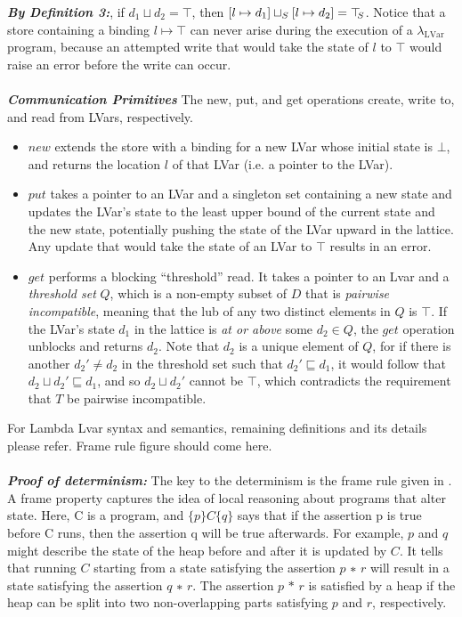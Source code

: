 \documentclass[twocolumn]{article}
\newcommand{\lambdaLVar}{\ensuremath{\lambda_{\textrm{LVar}}}}
\newcommand{\userleq}{\ensuremath{\sqsubseteq}}
\newcommand{\topS}{\ensuremath{\top\hspace{-0.85mm}_{S}}}
\newcommand{\userlub}[2]{\ensuremath{#1 \sqcup #2}}
\newcommand{\lubstore}[2]{\ensuremath{#1 \sqcup_{S} #2}}
\newcommand{\storebindingRaw}[2]{\ensuremath{#1 \mapsto #2}}
\newcommand{\store}[1]{\left[ #1 \right]}
\begin{document}
\textbf{\textit{By Definition 3:}}, if $\userlub{d_1}{d_2} = \top$, then $\lubstore{\store{\storebindingRaw{l}{d_1}}}{\store{\storebindingRaw{l}{d_2}}} = \topS$. Notice that a store containing a binding $\storebindingRaw{l}{\top}$ can never arise during the execution of a $\lambdaLVar$ program, because an attempted write that would take the state of $l$ to $\top$ would raise an error before the write can occur.\\ \\
\textbf{\textit{Communication Primitives}}
The new, put, and get operations create, write to, and read from LVars, respectively.
\begin{itemize} 
\item $new$ extends the store with a binding for a new LVar whose initial state is $\bot$, and returns the location $l$ of that LVar (i.e. a pointer to the LVar).
\item $put$ takes a pointer to an LVar and a singleton set containing a new state and updates the LVar’s state to the least upper bound of the current state and the new state, potentially pushing the state of the LVar upward in the lattice. Any update that would take the state of an LVar to $\top$ results in an error.
\item $get$ performs a blocking “threshold” read. It takes a pointer to an Lvar and a \emph{threshold set} $Q$, which is a non-empty subset of $D$ that is \emph{pairwise incompatible}, meaning that the lub of any two distinct elements in $Q$ is $\top$. If the LVar's state $d_1$ in the lattice is \emph{at or above} some $d_2 \in Q$, the $get$ operation unblocks and returns $d_2$. Note that $d_2$ is a unique element of $Q$, for if there is another $d_2' \neq d_2$ in the threshold set such that $d_2' \userleq d_1$, it would follow that $d_2 \sqcup d_2' \userleq d_1$, and so $d_2 \sqcup d_2'$ cannot be $\top$, which contradicts the requirement that $T$ be pairwise incompatible.
\end{itemize}
For Lambda Lvar syntax and semantics, remaining definitions and its details please refer\cite{lkuper}. 
Frame rule figure should come here. \\ \\
\textbf{\textit{Proof of determinism:}} The key to the determinism is the frame rule given in \cite{Figure1}. A frame property captures the idea of local reasoning about programs that alter state\cite{lindsey}. Here, C is a program, and $\{p\} C \{q\}$ says that if the assertion p  is true before C  runs, then the assertion q  will be true afterwards. For example, $p$ and $q$  might describe the state of the heap before and after it is updated by $C$. It tells that running $C$ starting from a state satisfying the assertion $p$ $∗$ $r$ will result in a state satisfying the assertion $q$ $∗$ $r$. The assertion $p$ $*$ $r$ is satisfied by a heap if the heap can be split into two non-overlapping parts satisfying $p$ and $r$, respectively.
\end{document}
